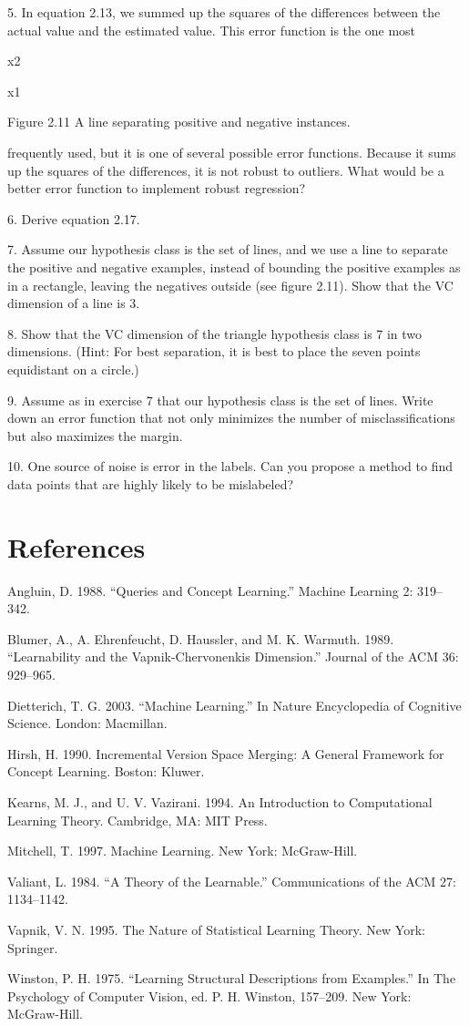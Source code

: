 5. In equation 2.13, we summed up the squares of the differences between the actual value and the estimated value. This error function is the one most

x2

x1

Figure 2.11 A line separating positive and negative instances.

frequently used, but it is one of several possible error functions. Because it sums up the squares of the differences, it is not robust to outliers. What would be a better error function to implement robust regression?

6. Derive equation 2.17.

7. Assume our hypothesis class is the set of lines, and we use a line to separate the positive and negative examples, instead of bounding the positive examples as in a rectangle, leaving the negatives outside (see figure 2.11). Show that the VC dimension of a line is 3.

8. Show that the VC dimension of the triangle hypothesis class is 7 in two dimensions. (Hint: For best separation, it is best to place the seven points equidistant on a circle.)

9. Assume as in exercise 7 that our hypothesis class is the set of lines. Write down an error function that not only minimizes the number of misclassifications but also maximizes the margin.

10. One source of noise is error in the labels. Can you propose a method to find data points that are highly likely to be mislabeled?

\section{References}

Angluin, D. 1988. “Queries and Concept Learning.” Machine Learning 2: 319-- 342.

Blumer, A., A. Ehrenfeucht, D. Haussler, and M. K. Warmuth. 1989. “Learnability and the Vapnik-Chervonenkis Dimension.” Journal of the ACM 36: 929--965.

Dietterich, T. G. 2003. “Machine Learning.” In Nature Encyclopedia of Cognitive Science. London: Macmillan.

Hirsh, H. 1990. Incremental Version Space Merging: A General Framework for Concept Learning. Boston: Kluwer.

Kearns, M. J., and U. V. Vazirani. 1994. An Introduction to Computational Learning Theory. Cambridge, MA: MIT Press.

Mitchell, T. 1997. Machine Learning. New York: McGraw-Hill.

Valiant, L. 1984. “A Theory of the Learnable.” Communications of the ACM 27: 1134--1142.

Vapnik, V. N. 1995. The Nature of Statistical Learning Theory. New York: Springer.

Winston, P. H. 1975. “Learning Structural Descriptions from Examples.” In The Psychology of Computer Vision, ed. P. H. Winston, 157--209. New York: McGraw-Hill.
